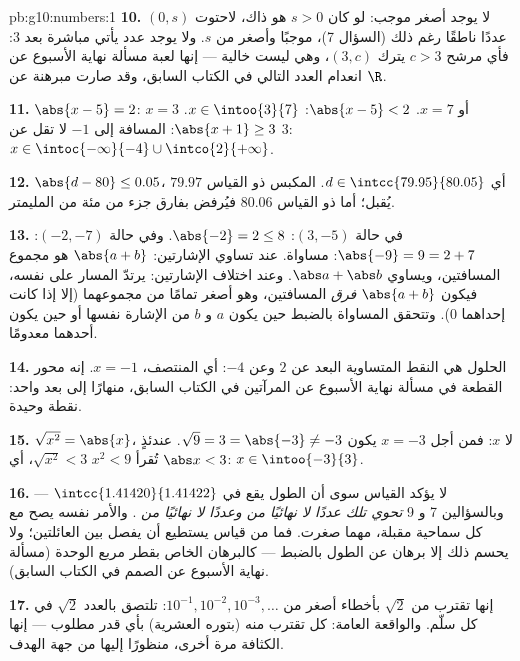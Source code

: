\begin{solution}{pb:g10:numbers:1}
\textbf{10.} لا يوجد أصغر  موجب: لو كان $s > 0$ هو
ذاك، لاحتوت  $(0, s)$ عددًا ناطقًا رغم ذلك (السؤال 7)،
موجبًا وأصغر من $s$. ولا يوجد عدد يأتي مباشرة بعد $3$: فأي
مرشح $c > 3$ يترك  $(3, c)$، وهي ليست
خالية --- إنها لعبة مسألة نهاية الأسبوع عن انعدام العدد التالي في الكتاب السابق، وقد صارت مبرهنة عن
$\R$.

\textbf{11.} $\abs{x - 5} = 2$: $x = 3$ أو $x = 7$.
$\abs{x - 5} < 2$: $x \in \intoo{3}{7}$.
$\abs{x + 1} \geq 3$: المسافة إلى $-1$ لا تقل عن $3$:
$x \in \intoc{-\infty}{-4} \cup \intco{2}{+\infty}$.

\textbf{12.} $\abs{d - 80} \leq 0.05$، أي
$d \in \intcc{79.95}{80.05}$. المكبس ذو القياس $79.97$ يُقبل؛
أما ذو القياس $80.06$ فيُرفض بفارق جزء من مئة من المليمتر.

\textbf{13.} في حالة $(3, -5)$: $\abs{-2} = 2 \leq 8$. وفي حالة $(-2, -7)$:
$\abs{-9} = 9 = 2 + 7$: مساواة. عند تساوي الإشارتين: $\abs{a + b}$ هو
مجموع المسافتين، ويساوي $\abs a + \abs b$. وعند اختلاف
الإشارتين: يرتدّ المسار على نفسه، فيكون $\abs{a + b}$
\emph{فرق} المسافتين، وهو أصغر تمامًا من
مجموعهما (إلا إذا كانت إحداهما $0$). وتتحقق المساواة بالضبط حين يكون $a$ و
$b$ من الإشارة نفسها أو حين يكون أحدهما معدومًا.

\textbf{14.} الحلول هي النقط المتساوية البعد عن $2$
وعن $-4$: أي المنتصف، $x = -1$. إنه محور
القطعة في مسألة نهاية الأسبوع عن المرآتين في الكتاب السابق، منهارًا إلى بعد
واحد: نقطة وحيدة.

\textbf{15.} $\sqrt{x^2} = \abs{x}$، لا $x$: فمن أجل $x = -3$ يكون
$\sqrt{9} = 3 = \abs{-3} \neq -3$. عندئذٍ تُقرأ $x^2 < 9$
$\sqrt{x^2} < 3$، أي $\abs x < 3$:
$x \in \intoo{-3}{3}$.

\textbf{16.} لا يؤكد القياس سوى أن الطول يقع
في  $\intcc{1.41420}{1.41422}$ --- وبالسؤالين
7 و 9 \emph{تحوي تلك  عددًا لا نهائيًا من 
وعددًا لا نهائيًا من }. والأمر نفسه يصح مع كل
سماحية مقبلة، مهما صغرت. فما من قياس يستطيع أن
يفصل بين العائلتين؛ ولا يحسم ذلك إلا برهان عن الطول بالضبط
--- كالبرهان الخاص بقطر مربع الوحدة
(مسألة نهاية الأسبوع عن الصمم في الكتاب السابق).

\textbf{17.} إنها تقترب من $\sqrt2$ بأخطاء أصغر من
$10^{-1}, 10^{-2}, 10^{-3}, \dots$:  تلتصق بالعدد
$\sqrt2$ في كل سلّم. والواقعة العامة: كل 
تقترب منه  (بتوره العشرية) بأي قدر
مطلوب --- إنها الكثافة مرة أخرى، منظورًا إليها من جهة
الهدف.


\end{solution}
